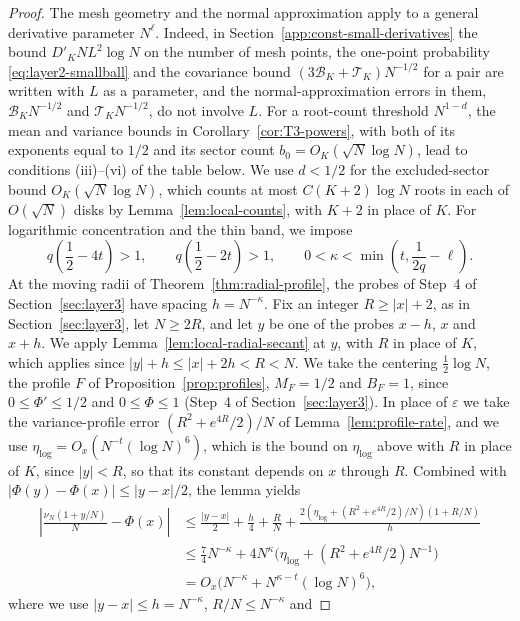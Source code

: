 \begin{proof}
The mesh geometry and the normal approximation apply to a general
derivative parameter $N^\ell$.
Indeed, in Section~\ref{app:const-small-derivatives} the bound
$D'_KNL^2\log N$ on the number of mesh points, the one-point probability
\eqref{eq:layer2-smallball} and the covariance bound
$(3\mathcal B_K+\mathcal T_K)N^{-1/2}$ for a pair are written with $L$
as a parameter, and the normal-approximation errors in them,
$\mathcal B_KN^{-1/2}$ and $\mathcal T_KN^{-1/2}$, do not involve $L$.
For a root-count threshold $N^{1-d}$, the mean and variance bounds in
Corollary~\ref{cor:T3-powers}, with both of its exponents equal to $1/2$
and its sector count $b_0=O_K(\sqrt N\log N)$, lead to conditions
(iii)--(vi) of the table below.
We use $d<1/2$ for the excluded-sector bound
$O_K(\sqrt N\log N)$, which counts at most $C(K+2)\log N$ roots in each
of $O(\sqrt N)$ disks by Lemma~\ref{lem:local-counts}, with $K+2$ in place of $K$.
For logarithmic concentration and the thin band, we impose
\[
 q\left(\frac12-4t\right)>1,\qquad
 q\left(\frac12-2t\right)>1,\qquad
 0<\kappa<\min\left(t,\frac1{2q}-\ell\right).
                                                        \tag{S}
\]
At the moving radii of Theorem~\ref{thm:radial-profile}, the probes of
Step~4 of Section~\ref{sec:layer3} have spacing $h=N^{-\kappa}$.
Fix an integer $R\ge|x|+2$, as in Section~\ref{sec:layer3}, let
$N\ge2R$, and let $y$ be one of the probes $x-h$, $x$ and $x+h$. We apply
Lemma~\ref{lem:local-radial-secant} at $y$, with $R$ in place of $K$,
which applies since $|y|+h\le|x|+2h<R<N$. We take
the centering $\frac12\log N$, the profile $F$ of
Proposition~\ref{prop:profiles}, $M_F=1/2$ and $B_F=1$, since
$0\le\Phi'\le1/2$ and $0\le\Phi\le1$ (Step~4 of Section~\ref{sec:layer3}). In
place of $\varepsilon$ we take the variance-profile error
$(R^2+e^{4R}/2)/N$ of Lemma~\ref{lem:profile-rate}, and we use
$\eta_{\log}=O_x(N^{-t}(\log N)^6)$, which is the bound on $\eta_{\log}$
above with $R$ in place of $K$, since $|y|<R$, so that its constant
depends on $x$ through $R$. Combined with
$|\Phi(y)-\Phi(x)|\le|y-x|/2$, the lemma yields
\begin{align*}
 \left|\frac{\nu_N(1+y/N)}N-\Phi(x)\right|
 &\le\frac{|y-x|}2+\frac h4+\frac RN
 +\frac{2(\eta_{\log}+(R^2+e^{4R}/2)/N)(1+R/N)}h\\
 &\le\frac74N^{-\kappa}
   +4N^\kappa\bigl(\eta_{\log}+(R^2+e^{4R}/2)N^{-1}\bigr)\\
 &=O_x\bigl(N^{-\kappa}+N^{\kappa-t}(\log N)^6\bigr),
\end{align*}
where we use $|y-x|\le h=N^{-\kappa}$, $R/N\le N^{-\kappa}$ and

\end{proof}
